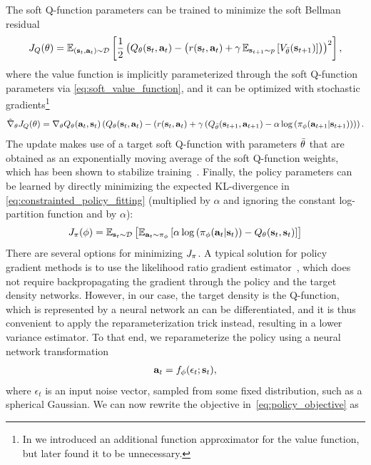The soft Q-function parameters can be trained to minimize the soft Bellman residual
\begin{align}
J_Q(\theta) = \operatorname{\mathbb{E}}_{({\mathbf{s}_t}, {\mathbf{a}_t})\sim\mathcal{D}}\left[\frac{1}{2}\left(Q_\theta({\mathbf{s}_t}, {\mathbf{a}_t}) - \left(r({\mathbf{s}_t}, {\mathbf{a}_t}) + \gamma \operatorname{\mathbb{E}}_{{\mathbf{s}_{t+1}}\sim p}\left[V_{\bar{\theta}}({\mathbf{s}_{t+1}})\right]\right)\right)^2\right],
\label{eq:q_cost}
\end{align}
where the value function is implicitly parameterized through the soft Q-function parameters via \autoref{eq:soft_value_function}, and it can be optimized with stochastic gradients\footnote{In \cite{haarnoja2018soft} we introduced an additional function approximator for the value function, but later found it to be unnecessary.}
\begin{align}
\hat \nabla_\theta J_Q(\theta) =  \nabla_\theta Q_\theta({\mathbf{a}_t}, {\mathbf{s}_t}) \left(Q_\theta({\mathbf{s}_t}, {\mathbf{a}_t}) - \left(r({\mathbf{s}_t},{\mathbf{a}_t}) + \gamma \left(Q_{\bar{\theta}}({\mathbf{s}_{t+1}}, {\mathbf{a}_{t+1}}) - \alpha \log\left(\pi_{\phi}({\mathbf{a}_{t+1}}|{\mathbf{s}_{t+1}}\right)\right)\right)\right).
\label{eq:q_stochastic_gradient}
\end{align}
The update makes use of a target soft Q-function with parameters $\bar{\theta}$ that are obtained as an exponentially moving average of the soft Q-function weights, which has been shown to stabilize training~\citep{mnih2015human}. Finally, the policy parameters can be learned by directly minimizing the expected KL-divergence in \autoref{eq:constrainted_policy_fitting} (multiplied by $\alpha$ and ignoring the constant log-partition function and by $\alpha$):
\begin{align}
J_\policy(\pparams) = \E{\st\sim\mathcal{D}}{\E{\at\sim\policy_\pparams}{\alpha \log\left(\policy_\pparams(\at|\st)\right) - Q_\params(\st, \st)}}
%
\label{eq:policy_objective}
\end{align}
There are several options for minimizing $J_\pi$. A typical solution for policy gradient methods is to use the likelihood ratio gradient estimator~\citep{williams1992simple}, which does not require backpropagating the gradient through the policy and the target density networks. However, in our case, the target density is the Q-function, which is represented by a neural network an can be differentiated, and it is thus convenient to apply the reparameterization trick instead, resulting in a lower variance estimator. To that end, we reparameterize the policy using a neural network transformation 
\begin{align}
{\mathbf{a}_t} = f_{\phi}(\epsilon_t; {\mathbf{s}_t}),
\end{align}
where $\epsilon_t$ is an input noise vector, sampled from some fixed distribution, such as a spherical Gaussian. We can now rewrite the objective in~\autoref{eq:policy_objective} as
